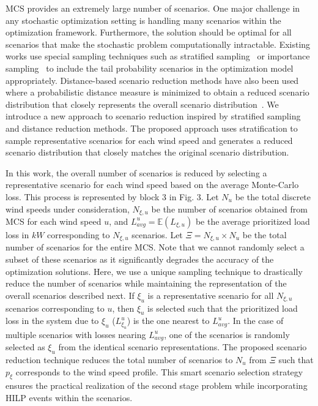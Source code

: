 \documentclass[hidelinks, 12pt]{article}
\begin{document}
MCS provides an extremely large number of scenarios. One major challenge in any stochastic optimization setting is handling many scenarios within the optimization framework. Furthermore, the solution should be optimal for all scenarios that make the stochastic problem computationally intractable. Existing works use special sampling techniques such as stratified sampling~\cite{parsons2014stratified} or importance sampling~\cite{ekblom2020importance} to include the tail probability scenarios in the optimization model appropriately. Distance-based scenario reduction methods have also been used where a probabilistic distance measure is minimized to obtain a reduced scenario distribution that closely represents the overall scenario distribution~\cite{heitsch2007note}. We introduce a new approach to scenario reduction inspired by stratified sampling and distance reduction methods. The proposed approach uses stratification to sample representative scenarios for each wind speed and generates a reduced scenario distribution that closely matches the original scenario distribution.

In this work, the overall number of scenarios is reduced by selecting a representative scenario for each wind speed based on the average Monte-Carlo loss. This process is represented by block 3 in Fig. 3. Let $N_u$ be the total discrete wind speeds under consideration, $N_{\xi,u}$ be the number of scenarios obtained from MCS for each wind speed $u$, and $L^{u}_{avg} = \mathbb{E}(L_{\xi,u})$ be the average prioritized load loss in $kW$ corresponding to $N_{\xi,u}$ scenarios. Let $\Xi = N_{\xi,u} \times N_u$ be the total number of scenarios for the entire MCS. Note that we cannot randomly select a subset of these scenarios as it significantly degrades the accuracy of the optimization solutions. Here, we use a unique sampling technique to drastically reduce the number of scenarios while maintaining the representation of the overall scenarios described next. If $\xi_u$ is a representative scenario for all $N_{\xi,u}$ scenarios corresponding to $u$, then $\xi_u$ is selected such that the prioritized load loss in the system due to $\xi_u$ ($L^{u}_{\xi_u}$) is the one nearest to $L^{u}_{avg}$. In the case of multiple scenarios with losses nearing $L^{u}_{avg}$, one of the scenarios is randomly selected as $\xi_u$ from the identical scenario representations. The proposed scenario reduction technique reduces the total number of scenarios to $N_u$ from $\Xi$ such that $p_\xi$ corresponds to the wind speed profile. This smart scenario selection strategy ensures the practical realization of the second stage problem while incorporating HILP events within the scenarios. 
\end{document}
